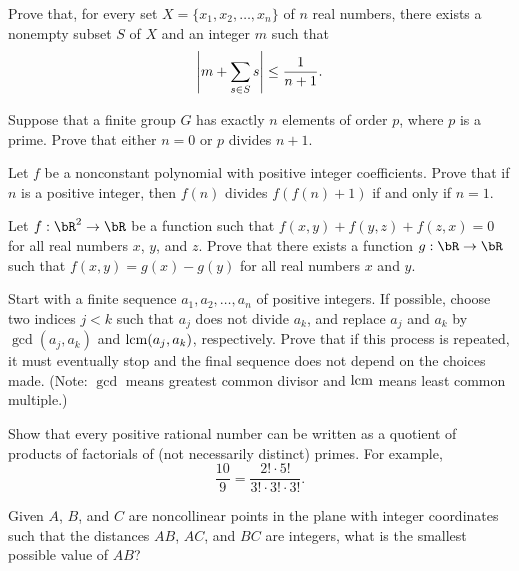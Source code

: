 \documentclass[12pt]{article}
\begin{document}
    \begin{exercise}[2006 B2]
        Prove that, for every set \(X=\{x_1,x_2,\ldots,x_n\}\) of \(n\) real numbers, there exists a nonempty subset \(S\) of \(X\) and an integer \(m\) such that
        \[\left\lvert m+\sum_{s\in S}s \right\rvert\leq \frac{1}{n+1}.\]
    \end{exercise}

    \begin{exercise}[2007 A5]
        Suppose that a finite group $G$ has exactly $n$ elements of order $p$, where $p$ is a prime. Prove that either $n=0$ or $p$ divides $n+1$. 
    \end{exercise}

    \begin{exercise}[2007 B1]
        Let $f$ be a nonconstant polynomial with positive integer coefficients. Prove that if $n$ is a positive integer, then $f(n)$ divides $f(f(n)+1)$ if and only if $n=1$.
    \end{exercise}
    
    \begin{exercise}[2008 A1]
        Let \(f:\bR^2\to\bR\) be a function such that \(f(x,y)+f(y,z)+f(z,x)=0\) for all real numbers \(x\), \(y\), and \(z\).
        Prove that there exists a function \(g:\bR\to\bR\) such that \(f(x,y)=g(x)-g(y)\) for all real numbers \(x\) and \(y\).
    \end{exercise}

    \begin{exercise}[2008 A3]
        Start with a finite sequence $a_1,a_2,\dots,a_n$ of positive integers. If possible, choose two indices $j < k$ such that $a_j$ does not divide $a_k$, and replace $a_j$ and $a_k$ by $\gcd(a_j , a_k )$ and $\operatorname*{lcm}(a_j , a_k )$, respectively. Prove that if this process is repeated, it must eventually stop and the final sequence does not depend on the choices made. (Note: $\gcd$ means greatest common divisor and $\operatorname*{lcm}$ means least common multiple.)
    \end{exercise}

    \begin{exercise}[2009 B1]
        Show that every positive rational number can be written as a quotient of products of factorials of (not necessarily distinct) primes.
        For example,
        \[\frac{10}{9} = \frac{2!\cdot 5!}{3!\cdot 3!\cdot 3!}.\]
    \end{exercise}

    \begin{exercise}[2010 B2]
        Given $A$, $B$, and $C$ are noncollinear points in the plane with integer coordinates such that the distances $AB$, $AC$, and $BC$ are integers, what is the smallest possible value of $AB$?
    \end{exercise}
\end{document}
